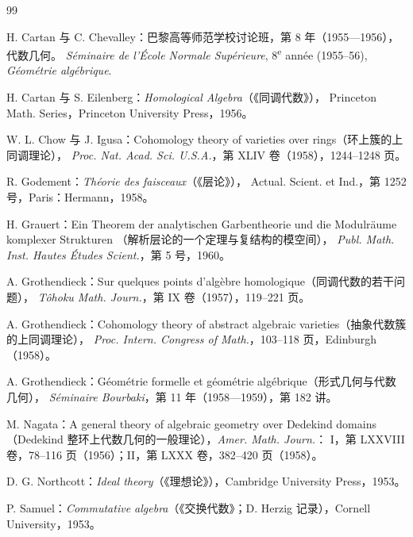 \clearpage\makeatletter\@mainmatterfalse\makeatother

\renewcommand{\bibname}{第一卷原著参考文献}
\begin{thebibliography}{99}
\small
{}
H. Cartan 与 C. Chevalley：巴黎高等师范学校讨论班，第 8 年（1955—1956），代数几何。
\textit{Séminaire de l'École Normale Supérieure}, 8\textsuperscript{e} année (1955–56),
\textit{Géométrie algébrique}.

H. Cartan 与 S. Eilenberg：\textit{Homological Algebra}（《同调代数》），
Princeton Math. Series，Princeton University Press，1956。

W. L. Chow 与 J. Igusa：Cohomology theory of varieties over rings（环上簇的上同调理论），
\textit{Proc. Nat. Acad. Sci. U.S.A.}，第 XLIV 卷（1958），1244–1248 页。

R. Godement：\textit{Théorie des faisceaux}（《层论》），
Actual. Scient. et Ind.，第 1252 号，Paris：Hermann，1958。

H. Grauert：Ein Theorem der analytischen Garbentheorie und die Modulräume komplexer Strukturen
（解析层论的一个定理与复结构的模空间），
\textit{Publ. Math. Inst. Hautes Études Scient.}，第 5 号，1960。

A. Grothendieck：Sur quelques points d'algèbre homologique（同调代数的若干问题），
\textit{Tôhoku Math. Journ.}，第 IX 卷（1957），119–221 页。

A. Grothendieck：Cohomology theory of abstract algebraic varieties（抽象代数簇的上同调理论），
\textit{Proc. Intern. Congress of Math.}，103–118 页，Edinburgh（1958）。

A. Grothendieck：Géométrie formelle et géométrie algébrique（形式几何与代数几何），
\textit{Séminaire Bourbaki}，第 11 年（1958—1959），第 182 讲。

M. Nagata：A general theory of algebraic geometry over Dedekind domains
（Dedekind 整环上代数几何的一般理论），\textit{Amer. Math. Journ.}：
I，第 LXXVIII 卷，78–116 页（1956）；II，第 LXXX 卷，382–420 页（1958）。

D. G. Northcott：\textit{Ideal theory}（《理想论》），Cambridge University Press，1953。

P. Samuel：\textit{Commutative algebra}（《交换代数》；D. Herzig 记录），Cornell University，1953。


\end{thebibliography}
